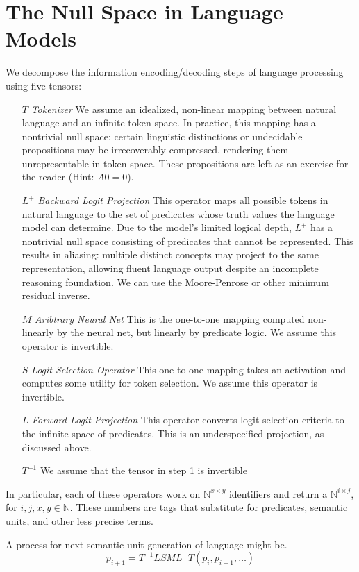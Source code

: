 \documentclass[12pt]{article}
\theoremstyle{plain}
\begin{document}
\section{The Null Space in Language Models}
We decompose the information encoding/decoding steps of language processing
using five tensors:
\begin{enumerate}
\item[$T$] \emph{Tokenizer} We assume an idealized, non-linear mapping 
 between natural language and an infinite token space. In practice, this 
 mapping has a nontrivial null space: certain linguistic distinctions or 
undecidable propositions may be irrecoverably compressed, rendering them 
unrepresentable in token space.  These propositions are left as an
        exercise for the reader (Hint: $A0 = 0$).
    \item[$L^+$] \emph{Backward Logit Projection} This operator maps all 
        possible tokens in natural language to the set of 
predicates whose truth values the language model can determine. Due to the model’s 
limited logical depth, $L^+$ has a nontrivial null space consisting of predicates 
that cannot be represented. This results in aliasing: multiple distinct concepts may 
project to the same representation, allowing fluent language output despite an 
incomplete reasoning foundation. We can use the Moore-Penrose or other minimum residual inverse.
    \item[$M$] \emph{Aribtrary Neural Net} This is the one-to-one mapping computed non-linearly by the neural net, 
    but linearly by predicate logic.  We assume this operator is invertible.
\item[$S$] \emph{Logit Selection Operator} This one-to-one mapping takes an activation and computes some utility for 
    token selection.  We assume this operator is invertible.
\item[$L$] \emph{Forward Logit Projection}  This operator converts logit selection criteria to the
    infinite space of predicates. This is an underspecified projection, as discussed above.
\item[$T^{-1}$] We assume that the tensor in step 1 is invertible
\end{enumerate}
In particular, each of these operators work on $\mathbb{N}^{x\times y}$ identifiers
and return a $\mathbb{N}^{i\times j}$, for $i,j,x,y\in\mathbb{N}$.  These numbers are tags 
that substitute for predicates, semantic units, and other less precise terms.

A process for next semantic unit generation of language might be.
$$
p_{i+1} = T^{-1} L S M  L^+ T (p_i,p_{i-1},\ldots)
$$
\end{document}

